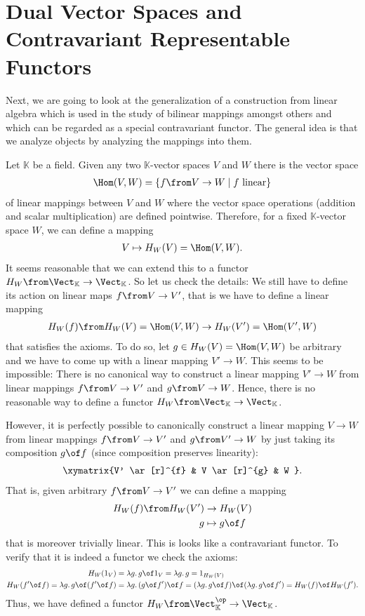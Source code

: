 \documentclass{article}
\theoremstyle{definition}
\begin{document}
\section{Dual Vector Spaces and Contravariant Representable Functors}
Next, we are going to look at the generalization of a construction from linear algebra which is used in the study of bilinear mappings amongst others and which can be regarded as a special contravariant functor. The general idea is that we analyze objects by analyzing the mappings into them.

Let $\mathbb K$ be a field. Given any two $\mathbb K$-vector spaces $V$ and $W$ there is the vector space
\begin{align*}
  \Hom(V,W)=\{f\from V\to W\mid f \text{ linear}\}
\end{align*}
of linear mappings between $V$ and $W$ where the vector space operations (addition and scalar multiplication) are defined pointwise. Therefore, for a fixed $\mathbb K$-vector space $W$, we can define a mapping
\begin{align*}
  V\mapsto H_W(V)=\Hom(V,W).
\end{align*}
It seems reasonable that we can extend this to a functor $H_W\from\Vect_{\mathbb K}\to\Vect_{\mathbb K}$. So let us check the details: We still have to define its action on linear maps $f\from V\to V'$, that is we have to define a linear mapping
\begin{align*}
  H_W(f)\from H_W(V)=\Hom(V,W)\to H_W(V')=\Hom(V',W)
\end{align*}
 that satisfies the axioms. To do so, let $g\in H_W(V)=\Hom(V,W)$ be arbitrary and we have to come up with a linear mapping $V'\to W$. This seems to be impossible: There is no canonical way to construct a linear mapping $V'\to W$ from linear mappings $f\from V\to V'$ and $g\from V\to W$. Hence, there is no reasonable way to define a functor $H_W\from\Vect_{\mathbb K}\to\Vect_{\mathbb K}$.

However, it is perfectly possible to canonically construct a linear mapping $V\to W$ from linear mappings $f\from V\to V'$ and $g\from V'\to W$ by just taking its composition $g\of f$ (since composition preserves linearity):
\begin{align*}
  \xymatrix{V' \ar[r]^{f} & V \ar[r]^{g} & W }.
\end{align*}
That is, given arbitrary $f\from V\to V'$ we can define a mapping
\begin{align*}
  H_W(f)\from H_W(V')&\to H_W(V)\\
  g&\mapsto g\of f
\end{align*}
that is moreover trivially linear. This is looks like a contravariant functor. To verify that it is indeed a functor we check the axioms:
\begin{align*}
  H_W(1_V)&=\lambda g\ldotp g\of 1_V=\lambda g\ldotp g=1_{H_W(V)}\\
  H_W(f'\of f)=\lambda g\ldotp g\of (f'\of f)&=\lambda g\ldotp (g\of f')\of f=(\lambda g\ldotp g\of f)\of (\lambda g\ldotp g\of f')=H_W(f)\of H_W(f').
\end{align*}
Thus, we have defined a functor $H_W\from\Vect_{\mathbb K}^\op\to\Vect_{\mathbb K}$.
\end{document}
